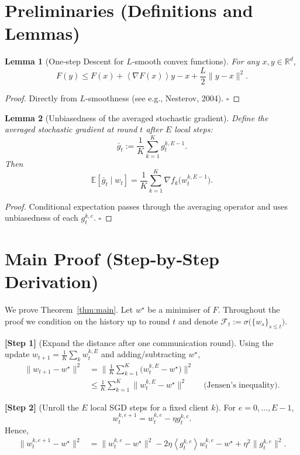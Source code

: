\documentclass[11pt]{article}
\newtheorem{lemma}{Lemma}
\newcommand{\E}{\mathbb{E}}
\newcommand{\inner}[1]{\left\langle#1\right\rangle}
\newcommand{\R}{\mathbb{R}}
\newcommand{\grad}{\nabla}
\begin{document}
\newpage
\section*{Preliminaries (Definitions and Lemmas)}
\begin{lemma}[One‑step Descent for $L$‑smooth convex functions]\label{lem:descent}
For any $x,y\in\R^d$,
\[
F(y)\le F(x)+\inner{\grad F(x)}{y-x}+\frac{L}{2}\|y-x\|^2 .
\]
\end{lemma}
\begin{proof}
Directly from $L$‑smoothness (see e.g., Nesterov, 2004). \hfill $\square$
\end{proof}

\begin{lemma}[Unbiasedness of the averaged stochastic gradient]\label{lem:unbiased}
Define the averaged stochastic gradient at round $t$ after $E$ local steps:
\[
\bar g_t:=\frac1K\sum_{k=1}^{K} g_{t}^{k,E-1}.
\]
Then
\[
\E[\bar g_t\mid w_t]=\frac1K\sum_{k=1}^{K}\grad f_k\!\big(w_{t}^{k,E-1}\big).
\]
\end{lemma}
\begin{proof}
Conditional expectation passes through the averaging operator and uses unbiasedness of each $g_{t}^{k,e}$. \hfill $\square$
\end{proof}

\section*{Main Proof (Step‑by‑Step Derivation)}
We prove Theorem~\ref{thm:main}.  Let $w^\star$ be a minimiser of $F$.  Throughout the proof we condition on the history up to round $t$ and denote $\mathcal{F}_t:=\sigma\!\big(\{w_s\}_{s\le t}\big)$.

\noindent\textbf{[Step 1]} (Expand the distance after one communication round).  
Using the update $w_{t+1}= \frac1K\sum_{k} w_{t}^{k,E}$ and adding/subtracting $w^\star$,
\[
\begin{aligned}
\|w_{t+1}-w^\star\|^2
&= \Big\|\frac1K\sum_{k=1}^{K}\big(w_{t}^{k,E}-w^\star\big)\Big\|^2\\
&\le \frac1K\sum_{k=1}^{K}\|w_{t}^{k,E}-w^\star\|^2
\qquad\text{(Jensen's inequality)}.
\end{aligned}
\tag{1}
\]

\noindent\textbf{[Step 2]} (Unroll the $E$ local SGD steps for a fixed client $k$).  
For $e=0,\dots,E-1$,
\[
w_{t}^{k,e+1}=w_{t}^{k,e}-\eta g_{t}^{k,e}.
\]
Hence,
\[
\begin{aligned}
\|w_{t}^{k,e+1}-w^\star\|^2
&= \|w_{t}^{k,e}-w^\star\|^2 -2\eta\inner{g_{t}^{k,e}}{w_{t}^{k,e}-w^\star}
   +\eta^2\|g_{t}^{k,e}\|^2 .
\end{aligned}
\tag{2}
\]
\end{document}
